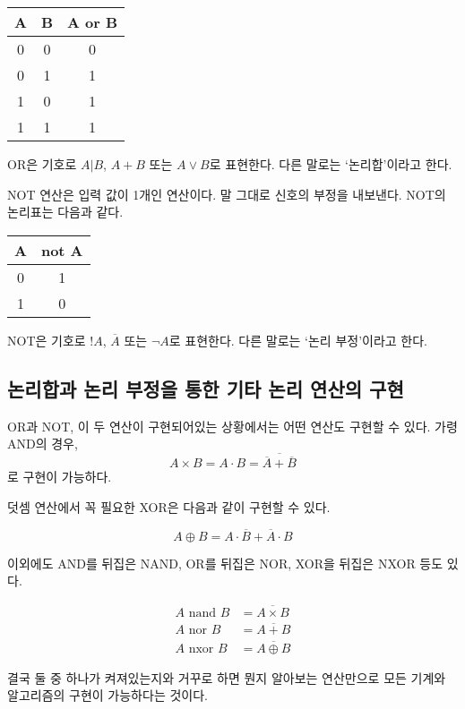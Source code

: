 \documentclass{article}
\begin{document}
\begin{center}
    \begin{tabular}{cc|c}
        A & B & A or B \\
        \hline
        0 & 0 & 0 \\
        0 & 1 & 1 \\
        1 & 0 & 1 \\
        1 & 1 & 1
    \end{tabular}
\end{center}

OR은 기호로 $A | B$, $A + B$ 또는 $A \vee B$로 표현한다. 다른 말로는 `논리합'이라고 한다.

NOT 연산은 입력 값이 1개인 연산이다. 말 그대로 신호의 부정을 내보낸다.
NOT의 논리표는 다음과 같다.

\begin{center}
    \begin{tabular}{c|c}
        A & not A \\
        \hline
        0 & 1 \\
        1 & 0
    \end{tabular}
\end{center}

NOT은 기호로 $!A$, $\overline A$ 또는 $\neg A$로 표현한다. 다른 말로는 `논리 부정'이라고 한다.

\subsection{논리합과 논리 부정을 통한 기타 논리 연산의 구현}

OR과 NOT, 이 두 연산이 구현되어있는 상황에서는 어떤 연산도 구현할 수 있다. 가령 AND의 경우,
$$A \times B = A \cdot B = \overline{\overline A + \overline B}$$
로 구현이 가능하다.

덧셈 연산에서 꼭 필요한 XOR은 다음과 같이 구현할 수 있다.

$$
A \oplus B = {A} \cdot \overline B + \overline A \cdot B
$$

이외에도 AND를 뒤집은 NAND, OR를 뒤집은 NOR, XOR을 뒤집은 NXOR 등도 있다.

$$
\begin{aligned}
    A \text{ nand } B &= \overline{A \times B} \\
    A \text{ nor } B &= \overline{A + B} \\
    A \text{ nxor } B &= \overline{A \oplus B}
\end{aligned}
$$

결국 둘 중 하나가 켜져있는지와 거꾸로 하면 뭔지 알아보는 연산만으로
모든 기계와 알고리즘의 구현이 가능하다는 것이다.
\end{document}
